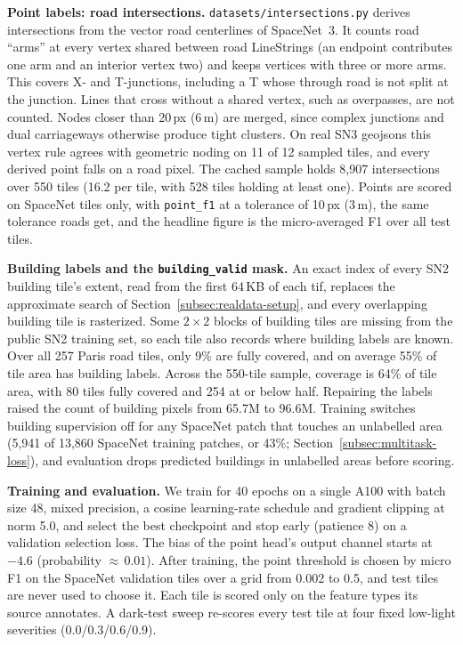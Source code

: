 \textbf{Point labels: road intersections.} \texttt{datasets/intersections.py} derives
intersections from the vector road centerlines of SpaceNet~3. It counts road ``arms'' at every
vertex shared between road LineStrings (an endpoint contributes one arm and an interior vertex two)
and keeps vertices with three or more arms. This covers X- and T-junctions, including a T whose
through road is not split at the junction. Lines that cross without a shared vertex, such as
overpasses, are not counted. Nodes closer than 20\,px (6\,m) are merged, since complex junctions and
dual carriageways otherwise produce tight clusters. On real SN3 geojsons this vertex rule agrees
with geometric noding on 11 of 12 sampled tiles, and every derived point falls on a road pixel. The
cached sample holds 8,907 intersections over 550 tiles (16.2 per tile, with 528 tiles holding at
least one). Points are scored on SpaceNet tiles only, with \texttt{point\_f1} at a tolerance of
10\,px (3\,m), the same tolerance roads get, and the headline figure is the micro-averaged F1 over
all test tiles.

\textbf{Building labels and the \texttt{building\_valid} mask.} An exact index of every SN2
building tile's extent, read from the first 64\,KB of each tif, replaces the approximate search of
Section~\ref{subsec:realdata-setup}, and every overlapping building tile is rasterized. Some
$2\times2$ blocks of building tiles are missing from the public SN2 training set, so each tile also
records where building labels are known. Over all 257 Paris road tiles, only 9\% are fully covered,
and on average 55\% of tile area has building labels. Across the 550-tile sample, coverage is 64\%
of tile area, with 80 tiles fully covered and 254 at or below half. Repairing the labels raised the
count of building pixels from 65.7M to 96.6M. Training switches building supervision off for any
SpaceNet patch that touches an unlabelled area (5,941 of 13,860 SpaceNet training patches, or 43\%;
Section~\ref{subsec:multitask-loss}), and evaluation drops predicted buildings in unlabelled areas
before scoring.

\textbf{Training and evaluation.} We train for 40 epochs on a single A100 with batch size 48, mixed
precision, a cosine learning-rate schedule and gradient clipping at norm 5.0, and select the best
checkpoint and stop early (patience 8) on a validation selection loss. The bias of the point head's
output channel starts at $-4.6$ (probability ${\approx}\,0.01$). After training, the point
threshold is chosen by micro F1 on the SpaceNet validation tiles over a grid from 0.002 to 0.5, and
test tiles are never used to choose it. Each tile is scored only on the feature types its source
annotates. A dark-test sweep re-scores every test tile at four fixed low-light severities
(0.0/0.3/0.6/0.9).

